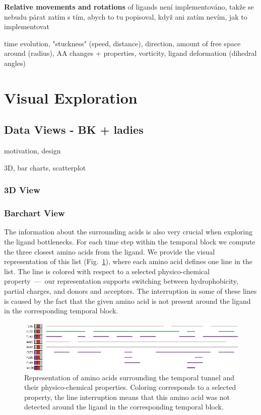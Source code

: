 \documentclass[twocolumn]{bmcart}%
\begin{document}
\begin{itemize}
{\color{red}\item \textbf{Relative movements and rotations} of ligands není implementováno, takže se nebudu párat zatím s tím, abych to tu popisoval, když ani zatím nevím, jak to implementovat} 

\end{itemize}


time evolution, "stuckness" (speed, distance), direction, amount of free space around (radius), AA changes + properties, vorticity, ligand deformation (dihedral angles)

\section*{Visual Exploration}

\subsection*{Data Views - BK + ladies}
motivation, design

3D, bar charts, scatterplot

\subsubsection*{3D View}

\subsubsection*{Barchart View}


The information about the surrounding acids is also very crucial when exploring the ligand bottlenecks. 
For each time step within the temporal block we compute the three closest amino acids from the ligand. 
We provide the visual representation of this list (Fig.~\ref{fig:aacids}), where each amino acid defines one line in the list. 
The line is colored with respect to a selected physico-chemical property~---~our representation supports switching between hydrophobicity, partial charges, and donors and acceptors.
The interruption in some of these lines is caused by the fact that the given amino acid is not present around the ligand in the corresponding temporal block.

\begin{figure}[htb]
	\centering
  \includegraphics[width=0.95\linewidth]{img/aacids.png}
  \caption{\label{fig:aacids} Representation of amino acids surrounding the temporal tunnel and their physico-chemical properties. Coloring corresponds to a selected property, the line interruption means that this amino acid was not detected around the ligand in the corresponding temporal block.}
\end{figure}
\end{document}
